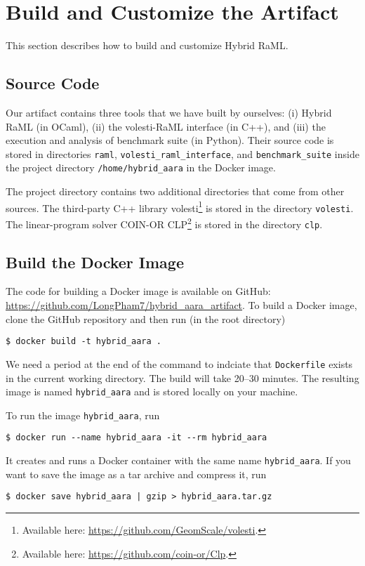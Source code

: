 
\section{Build and Customize the Artifact}

This section describes how to build and customize Hybrid RaML.

\subsection{Source Code}
\label{sec:Source Code}

Our artifact contains three tools that we have built by ourselves: (i) Hybrid
RaML (in OCaml), (ii) the volesti-RaML interface (in C++), and (iii) the
execution and analysis of benchmark suite (in Python).
%
Their source code is stored in directories \texttt{raml},
\texttt{volesti\_raml\_interface}, and \texttt{benchmark\_suite} inside the
project directory \texttt{/home/hybrid\_aara} in the Docker image.

The project directory contains two additional directories that come from other
sources.
%
The third-party C++ library volesti\footnote{Available here:
  \url{https://github.com/GeomScale/volesti}.} is stored in the directory
\texttt{volesti}.
%
The linear-program solver COIN-OR CLP\footnote{Available here:
  \url{https://github.com/coin-or/Clp}.} is stored in the directory \texttt{clp}.

\subsection{Build the Docker Image}

The code for building a Docker image is available on GitHub:
\url{https://github.com/LongPham7/hybrid_aara_artifact}.
%
To build a Docker image, clone the GitHub repository and then run (in the root
directory)
\begin{verbatim}
$ docker build -t hybrid_aara .
\end{verbatim}
%
We need a period at the end of the command to indciate that \texttt{Dockerfile}
exists in the current working directory.
%
The build will take 20--30 minutes.
%
The resulting image is named \texttt{hybrid\_aara} and is stored locally on your
machine.

To run the image \texttt{hybrid\_aara}, run
\begin{verbatim}
$ docker run --name hybrid_aara -it --rm hybrid_aara
\end{verbatim}
%
It creates and runs a Docker container with the same name \texttt{hybrid\_aara}.
%
If you want to save the image as a tar archive and compress it, run
\begin{verbatim}
$ docker save hybrid_aara | gzip > hybrid_aara.tar.gz
\end{verbatim}

